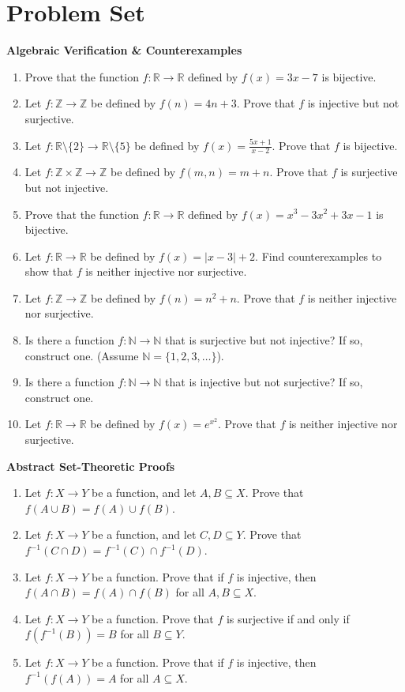 \documentclass[11pt, letterpaper]{article}
\theoremstyle{definition}
\theoremstyle{remark}
\newcommand{\R}{\mathbb{R}}
\newcommand{\N}{\mathbb{N}}
\newcommand{\Z}{\mathbb{Z}}
\begin{document}
\newpage

\section{Problem Set}

\textbf{Algebraic Verification \& Counterexamples}

\begin{enumerate}[label=\textbf{\arabic*.}]
    \item Prove that the function $f : \R \to \R$ defined by $f(x) = 3x - 7$ is bijective.
    \item Let $f : \Z \to \Z$ be defined by $f(n) = 4n + 3$. Prove that $f$ is injective but not surjective.
    \item Let $f : \R \setminus \{2\} \to \R \setminus \{5\}$ be defined by $f(x) = \frac{5x+1}{x-2}$. Prove that $f$ is bijective.
    \item Let $f : \Z \times \Z \to \Z$ be defined by $f(m,n) = m + n$. Prove that $f$ is surjective but not injective.
    \item Prove that the function $f : \R \to \R$ defined by $f(x) = x^3 - 3x^2 + 3x - 1$ is bijective.
    \item Let $f : \R \to \R$ be defined by $f(x) = |x-3| + 2$. Find counterexamples to show that $f$ is neither injective nor surjective.
    \item Let $f : \Z \to \Z$ be defined by $f(n) = n^2 + n$. Prove that $f$ is neither injective nor surjective.
    \item Is there a function $f : \N \to \N$ that is surjective but not injective? If so, construct one. (Assume $\N = \{1, 2, 3, \dots\}$).
    \item Is there a function $f : \N \to \N$ that is injective but not surjective? If so, construct one.
    \item Let $f : \R \to \R$ be defined by $f(x) = e^{x^2}$. Prove that $f$ is neither injective nor surjective.
\end{enumerate}

\textbf{Abstract Set-Theoretic Proofs}

\begin{enumerate}[label=\textbf{\arabic*.}, resume]
    \item Let $f : X \to Y$ be a function, and let $A, B \subseteq X$. Prove that $f(A \cup B) = f(A) \cup f(B)$.
    \item Let $f : X \to Y$ be a function, and let $C, D \subseteq Y$. Prove that $f^{-1}(C \cap D) = f^{-1}(C) \cap f^{-1}(D)$.
    \item Let $f : X \to Y$ be a function. Prove that if $f$ is injective, then $f(A \cap B) = f(A) \cap f(B)$ for all $A, B \subseteq X$.
    \item Let $f : X \to Y$ be a function. Prove that $f$ is surjective if and only if $f(f^{-1}(B)) = B$ for all $B \subseteq Y$.
    \item Let $f : X \to Y$ be a function. Prove that if $f$ is injective, then $f^{-1}(f(A)) = A$ for all $A \subseteq X$.
\end{enumerate}
\end{document}
